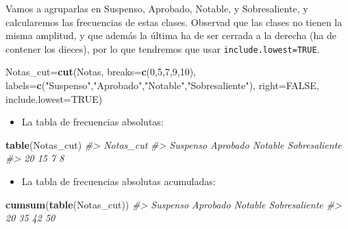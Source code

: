 \documentclass[
]{book}
\newenvironment{Shaded}{\begin{snugshade}}{\end{snugshade}}
\newcommand{\CommentTok}[1]{\textcolor[rgb]{0.56,0.35,0.01}{\textit{#1}}}
\newcommand{\DataTypeTok}[1]{\textcolor[rgb]{0.13,0.29,0.53}{#1}}
\newcommand{\DecValTok}[1]{\textcolor[rgb]{0.00,0.00,0.81}{#1}}
\newcommand{\KeywordTok}[1]{\textcolor[rgb]{0.13,0.29,0.53}{\textbf{#1}}}
\newcommand{\NormalTok}[1]{#1}
\newcommand{\OtherTok}[1]{\textcolor[rgb]{0.56,0.35,0.01}{#1}}
\newcommand{\StringTok}[1]{\textcolor[rgb]{0.31,0.60,0.02}{#1}}
\providecommand{\tightlist}{%
  \setlength{\itemsep}{0pt}\setlength{\parskip}{0pt}}
\theoremstyle{definition}
\theoremstyle{definition}
\theoremstyle{definition}
\theoremstyle{remark}
\begin{document}
Vamos a agruparlas en Suspenso, Aprobado, Notable, y Sobresaliente, y calcularemos las frecuencias de estas clases. Observad que las clases no tienen la misma amplitud, y que además la última ha de ser cerrada a la derecha (ha de contener los dieces), por lo que tendremos que usar \texttt{include.lowest=TRUE}.

\begin{Shaded}
\begin{Highlighting}[]
\NormalTok{Notas\_cut=}\KeywordTok{cut}\NormalTok{(Notas, }\DataTypeTok{breaks=}\KeywordTok{c}\NormalTok{(}\DecValTok{0}\NormalTok{,}\DecValTok{5}\NormalTok{,}\DecValTok{7}\NormalTok{,}\DecValTok{9}\NormalTok{,}\DecValTok{10}\NormalTok{),}
  \DataTypeTok{labels=}\KeywordTok{c}\NormalTok{(}\StringTok{"Suspenso"}\NormalTok{,}\StringTok{"Aprobado"}\NormalTok{,}\StringTok{"Notable"}\NormalTok{,}\StringTok{"Sobresaliente"}\NormalTok{),}
  \DataTypeTok{right=}\OtherTok{FALSE}\NormalTok{, }\DataTypeTok{include.lowest=}\OtherTok{TRUE}\NormalTok{)}
\end{Highlighting}
\end{Shaded}

\begin{itemize}
\tightlist
\item
  La tabla de frecuencias absolutas:
\end{itemize}

\begin{Shaded}
\begin{Highlighting}[]
\KeywordTok{table}\NormalTok{(Notas\_cut)  }
\CommentTok{\#\textgreater{} Notas\_cut}
\CommentTok{\#\textgreater{}      Suspenso      Aprobado       Notable Sobresaliente }
\CommentTok{\#\textgreater{}            20            15             7             8}
\end{Highlighting}
\end{Shaded}

\begin{itemize}
\tightlist
\item
  La tabla de frecuencias absolutas acumuladas:
\end{itemize}

\begin{Shaded}
\begin{Highlighting}[]
\KeywordTok{cumsum}\NormalTok{(}\KeywordTok{table}\NormalTok{(Notas\_cut))  }
\CommentTok{\#\textgreater{}      Suspenso      Aprobado       Notable Sobresaliente }
\CommentTok{\#\textgreater{}            20            35            42            50}
\end{Highlighting}
\end{Shaded}
\end{document}
